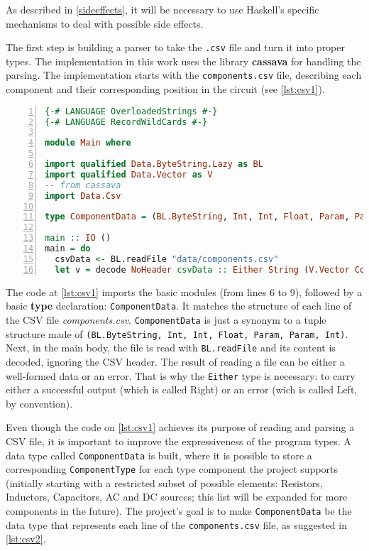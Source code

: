 As described in \cref{sideeffects}, it will be necessary to use Haskell's specific mechanisms to deal with possible side effects. 

The first step is building a parser to take the \lstinline!.csv! file and turn it into proper types. The implementation in this work uses the library \textbf{cassava} for handling the parsing. The implementation starts with the \lstinline!components.csv! file, describing each component and their corresponding position in the circuit (see \cref{lst:csv1}).


\begin{lstlisting}[language=Haskell, numbers=left, caption={Initial implementation of CSV file parsing with cassava}, captionpos=b, label={lst:csv1}]
{-# LANGUAGE OverloadedStrings #-}
{-# LANGUAGE RecordWildCards #-}

module Main where

import qualified Data.ByteString.Lazy as BL
import qualified Data.Vector as V
-- from cassava
import Data.Csv

type ComponentData = (BL.ByteString, Int, Int, Float, Param, Param, Int)

main :: IO ()
main = do
  csvData <- BL.readFile "data/components.csv"
  let v = decode NoHeader csvData :: Either String (V.Vector ComponentData)

\end{lstlisting}

The code at \cref{lst:csv1} imports the basic modules (from lines 6 to 9), followed by a basic \textbf{type} declaration: \lstinline!ComponentData!. It matches the structure of each line of the CSV file \textit{components.csv}. \lstinline!ComponentData! is just a synonym to a tuple structure made of \lstinline!(BL.ByteString, Int, Int, Float, Param, Param, Int)!. Next, in the main body, the file is read with \lstinline!BL.readFile! and its content is decoded, ignoring the CSV header. The result of reading a file can be either a well-formed data or an error. That is why the \lstinline!Either! type is necessary: to carry either a successful output (which is called Right) or an error (wich is called Left, by convention).

Even though the code on \cref{lst:csv1} achieves its purpose of reading and parsing a CSV file, it is important to improve the expressiveness of the program types. A data type called \lstinline!ComponentData! is built, where it is possible to store a corresponding \lstinline!ComponentType! for each type component the project supports (initially starting with a restricted subset of possible elements: Resistors, Inductors, Capacitors, AC and DC sources; this list will be expanded for more components in the future). The project's goal is to make \lstinline!ComponentData! be the data type that represents each line of the \lstinline!components.csv! file, as suggested in \cref{lst:csv2}.

